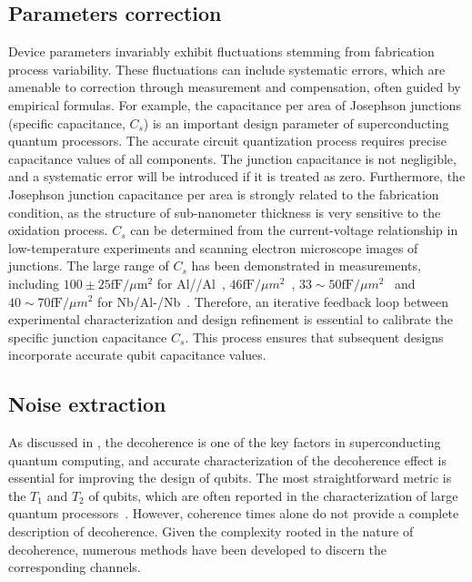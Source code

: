 \documentclass[a4paper,onecolumn,11pt,unpublished]{quantumarticle}
\begin{document}
\subsection{Parameters correction}
Device parameters invariably exhibit fluctuations stemming from fabrication process variability. These fluctuations can include systematic errors, which are amenable to correction through measurement and compensation, often guided by empirical formulas.
For example, the capacitance per area of Josephson junctions (specific capacitance, $C_s$) is an important design parameter of superconducting quantum processors. The accurate circuit quantization process requires precise capacitance values of all components. The junction capacitance is not negligible, and a systematic error will be introduced if it is treated as zero. Furthermore, the Josephson junction capacitance per area is strongly related to the  fabrication condition, as the  structure of sub-nanometer thickness is very sensitive to the oxidation process. $C_s$ can be determined from the current-voltage relationship in low-temperature experiments and scanning electron microscope images of junctions. The large range of $C_s$ has been demonstrated in measurements, including $100\pm 25\text{fF/}\mu\text{m}^2$ for Al//Al~\cite{Deppe2004Determination},  $46 \text{fF/}\mu{m}^2$~\cite{Xiong2017Development}, $33\sim 50\text{fF/}\mu{m}^2$~\cite{Xiong2018Measurement} and $40\sim 70\text{fF/}\mu{m}^2$ for Nb/Al-/Nb~\cite{Maezawa1995Specific}. Therefore, an iterative feedback loop between experimental characterization and design refinement is essential to calibrate the specific junction capacitance $C_s$. This process ensures that subsequent designs incorporate accurate qubit capacitance values.

\subsection{Noise extraction \label{subsec:noise_extraction}}
As discussed in , the decoherence is one of the key factors in superconducting quantum computing, and accurate characterization of the decoherence effect is essential for improving the design of qubits. The most straightforward metric is the $T_1$ and $T_2$ of qubits, which are often reported in the characterization of large quantum processors~\cite{Arute2019Quantum, Acharya2024Quantum, Zhao2022Realization,Gao2025Establishing}. However, coherence times alone do not provide a complete description of decoherence. Given the complexity rooted in the nature of decoherence, numerous methods have been developed to discern the corresponding channels.
\end{document}
